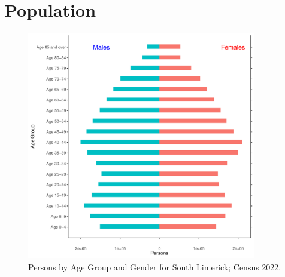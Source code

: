 \documentclass{article}
\begin{document}
\pagebreak

\section{Population} 
\label{sect:Pop}

\begin{figure}[h]
	\centering
	\includegraphics[width = 100mm]{../figures/PyramidPlot.pdf}
	\caption{Persons by Age Group and Gender for South Limerick; Census 2022.}
	\label{fig:2ae19629-1a6a-13a3-e055-000000000001}
	\end{figure}
\end{document}
